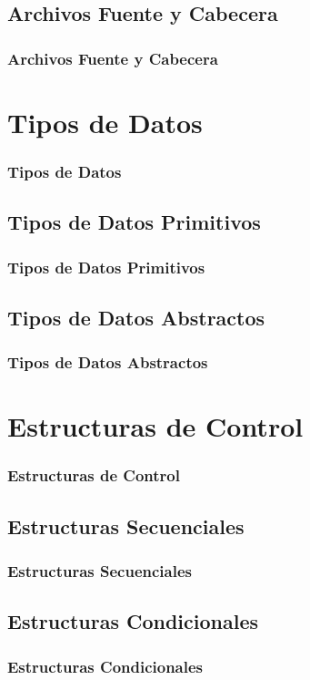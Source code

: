 \documentclass[xcolor=table]{beamer}
\begin{document}
\subsection{Archivos Fuente y Cabecera}
\begin{frame}
\frametitle{Archivos Fuente y Cabecera}

\end{frame}

\section{Tipos de Datos}
\begin{frame}
\frametitle{Tipos de Datos}

\end{frame}

\subsection{Tipos de Datos Primitivos}
\begin{frame}
\frametitle{Tipos de Datos Primitivos}

\end{frame}

\subsection{Tipos de Datos Abstractos}
\begin{frame}
\frametitle{Tipos de Datos Abstractos}

\end{frame}

\section{Estructuras de Control}
\begin{frame}
\frametitle{Estructuras de Control}    
\end{frame}

\subsection{Estructuras Secuenciales}
\begin{frame}
\frametitle{Estructuras Secuenciales}    
\end{frame}

\subsection{Estructuras Condicionales}
\begin{frame}
\frametitle{Estructuras Condicionales}    
\end{frame}
\end{document}
